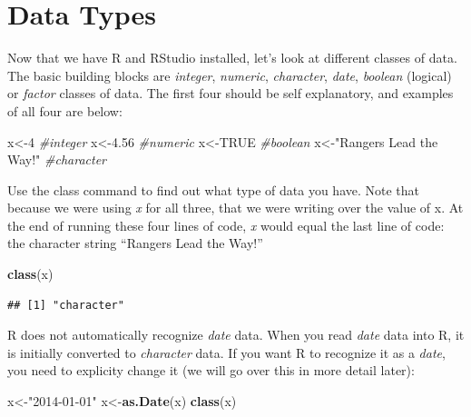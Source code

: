 \documentclass[]{book}
\newenvironment{Shaded}{\begin{snugshade}}{\end{snugshade}}
\newcommand{\KeywordTok}[1]{\textcolor[rgb]{0.13,0.29,0.53}{\textbf{{#1}}}}
\newcommand{\DecValTok}[1]{\textcolor[rgb]{0.00,0.00,0.81}{{#1}}}
\newcommand{\FloatTok}[1]{\textcolor[rgb]{0.00,0.00,0.81}{{#1}}}
\newcommand{\StringTok}[1]{\textcolor[rgb]{0.31,0.60,0.02}{{#1}}}
\newcommand{\CommentTok}[1]{\textcolor[rgb]{0.56,0.35,0.01}{\textit{{#1}}}}
\newcommand{\OtherTok}[1]{\textcolor[rgb]{0.56,0.35,0.01}{{#1}}}
\newcommand{\NormalTok}[1]{{#1}}
\begin{document}
\section{Data Types}\label{data-types}

Now that we have R and RStudio installed, let's look at different
classes of data. The basic building blocks are \emph{integer},
\emph{numeric}, \emph{character}, \emph{date}, \emph{boolean} (logical)
or \emph{factor} classes of data. The first four should be self
explanatory, and examples of all four are below:

\begin{Shaded}
\begin{Highlighting}[]
\NormalTok{x<-}\DecValTok{4}                   \CommentTok{#integer}
\NormalTok{x<-}\FloatTok{4.56}                \CommentTok{#numeric}
\NormalTok{x<-}\OtherTok{TRUE}                \CommentTok{#boolean}
\NormalTok{x<-}\StringTok{"Rangers Lead the Way!"}  \CommentTok{#character}
\end{Highlighting}
\end{Shaded}

Use the class command to find out what type of data you have. Note that
because we were using \emph{x} for all three, that we were writing over
the value of x. At the end of running these four lines of code, \emph{x}
would equal the last line of code: the character string ``Rangers Lead
the Way!''

\begin{Shaded}
\begin{Highlighting}[]
\KeywordTok{class}\NormalTok{(x)}
\end{Highlighting}
\end{Shaded}

\begin{verbatim}
## [1] "character"
\end{verbatim}

R does not automatically recognize \emph{date} data. When you read
\emph{date} data into R, it is initially converted to \emph{character}
data. If you want R to recognize it as a \emph{date}, you need to
explicity change it (we will go over this in more detail later):

\begin{Shaded}
\begin{Highlighting}[]
\NormalTok{x<-}\StringTok{"2014-01-01"}
\NormalTok{x<-}\KeywordTok{as.Date}\NormalTok{(x)}
\KeywordTok{class}\NormalTok{(x)}
\end{Highlighting}
\end{Shaded}
\end{document}
